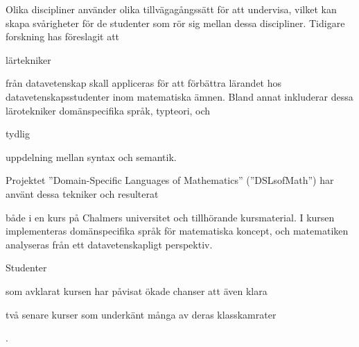 \iffalse
\todo[inline,color=other]{Vanlig utsträckning för denna text är uppmot en sida. Det här är en sammanfattning av de viktigaste delarna i vår text. Essentiellt att få med vilka ideer som ledde till detta projekt. Här behöver vi inte förklara vad saker som domänspecifika språk, reglerteknik och haskell är för nåt. det kommer i själva rapporten. Vi presenterar vårat projekt och resultaten(:/). Vi berättar vilka utvecklingsområden som finns och vilka projekt som skulle kunna bygga vidare på detta.}
\noindent

Checklista sammandrag (från writing.chalmers.se):
\begin{itemize}
\item Inledning: en kortkort bakgrund som också visar vikten av den här studien.
\item studiens frågeställning eller syfte (problemformulering om sådan finns)
\item metod – vad det är för typ av studie, hur har resultatet tagits fram? 
\item resultat – vad studien visar
\item slutsats – vad ni kommit fram till.  
\end{itemize}
\fi


\noindent
Olika discipliner använder olika tillvägagångssätt för att undervisa, vilket kan skapa svårigheter för de studenter som rör sig mellan dessa discipliner. Tidigare forskning has föreslagit att \begin{modtext}lärtekniker \end{modtext} från datavetenskap skall appliceras för att förbättra lärandet hos datavetenskapsstudenter inom matematiska ämnen. Bland annat inkluderar dessa lärotekniker domänspecifika språk, typteori, och \begin{modtext}tydlig \end{modtext} uppdelning mellan syntax och semantik. \begin{modtext}Projektet ''Domain-Specific Languages of Mathematics'' (''DSLsofMath'') har använt dessa tekniker och resulterat \end{modtext} både i en kurs på Chalmers universitet och tillhörande kursmaterial. I kursen implementeras domänspecifika språk för matematiska koncept, och matematiken analyseras från ett datavetenskapligt perspektiv. \begin{modtext}Studenter \end{modtext}som avklarat kursen har påvisat ökade chanser att även klara \begin{modtext}två senare kurser som underkänt många av deras klasskamrater\end{modtext}.

